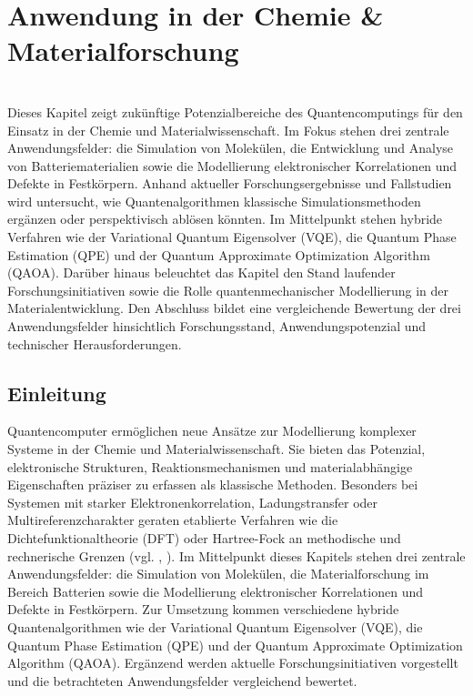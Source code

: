 
\chapter{Anwendung in der Chemie \& Materialforschung}
\label{trends} %


\abstract\\
Dieses Kapitel zeigt zukünftige Potenzialbereiche des Quantencomputings für den Einsatz in der Chemie und Materialwissenschaft. Im Fokus stehen drei zentrale Anwendungsfelder: die Simulation von Molekülen, die Entwicklung und Analyse von Batteriematerialien sowie die Modellierung elektronischer Korrelationen und Defekte in Festkörpern. Anhand aktueller Forschungsergebnisse und Fallstudien wird untersucht, wie Quantenalgorithmen klassische Simulationsmethoden ergänzen oder perspektivisch ablösen könnten. Im Mittelpunkt stehen hybride Verfahren wie der Variational Quantum Eigensolver (VQE), die Quantum Phase Estimation (QPE) und der Quantum Approximate Optimization Algorithm (QAOA). Darüber hinaus beleuchtet das Kapitel den Stand laufender Forschungsinitiativen sowie die Rolle quantenmechanischer Modellierung in der Materialentwicklung. Den Abschluss bildet eine vergleichende Bewertung der drei Anwendungsfelder hinsichtlich Forschungsstand, Anwendungspotenzial und technischer Herausforderungen.

\section{Einleitung}
\label{Chemie_Einleitung}
Quantencomputer ermöglichen neue Ansätze zur Modellierung komplexer Systeme in der Chemie und Materialwissenschaft. Sie bieten das Potenzial, elektronische Strukturen, Reaktionsmechanismen und materialabhängige Eigenschaften präziser zu erfassen als klassische Methoden. Besonders bei Systemen mit starker Elektronenkorrelation, Ladungstransfer oder Multireferenzcharakter geraten etablierte Verfahren wie die Dichtefunktionaltheorie (DFT) oder Hartree-Fock an methodische und rechnerische Grenzen (vgl. \cite{cao_quantum_2019}, \cite{vermaStatusChallengesDensity2020}). Im Mittelpunkt dieses Kapitels stehen drei zentrale Anwendungsfelder: die Simulation von Molekülen, die Materialforschung im Bereich Batterien sowie die Modellierung elektronischer Korrelationen und Defekte in Festkörpern. Zur Umsetzung kommen verschiedene hybride Quantenalgorithmen wie der Variational Quantum Eigensolver (VQE), die Quantum Phase Estimation (QPE) und der Quantum Approximate Optimization Algorithm (QAOA). Ergänzend werden aktuelle Forschungsinitiativen vorgestellt und die betrachteten Anwendungsfelder vergleichend bewertet.


